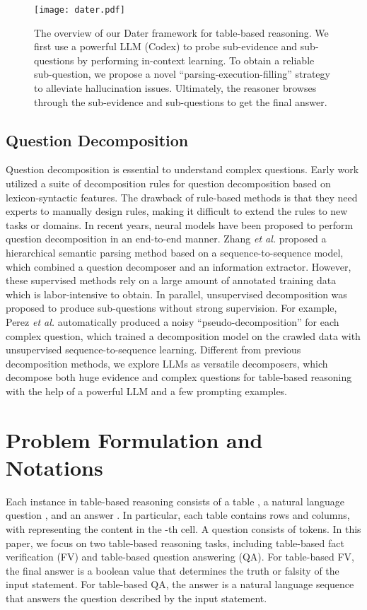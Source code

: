 \documentclass{article}
\begin{document}
\begin{figure*}
    \centering
    \setlength{\abovecaptionskip}{5pt} 
    \texttt{[image: dater.pdf]}
    \caption{The overview of our Dater framework for table-based reasoning. We first use a powerful LLM (Codex) to probe sub-evidence and sub-questions by performing in-context learning. To obtain a reliable sub-question, we propose a novel ``parsing-execution-filling'' strategy to alleviate hallucination issues. Ultimately, the reasoner browses through the sub-evidence and sub-questions to get the final answer.
    }
    \label{pipeline}
\end{figure*}

\subsection{Question Decomposition}
Question decomposition is essential to understand complex questions. Early work \citep{kalyanpur2012fact} utilized a suite of decomposition rules for question decomposition based on lexicon-syntactic features. The drawback of rule-based methods is that they need experts to manually design rules, making it difficult to extend the rules to new tasks or domains. In recent years, neural models \citep{talmor2018web,zhang2019complex} have been proposed to perform question decomposition in an end-to-end manner.
Zhang \textit{et al.} \citep{zhang2019complex} proposed a hierarchical semantic parsing method based on a sequence-to-sequence model, which combined a question decomposer and an information extractor. 
However, these supervised methods rely on a large amount of annotated training data which is labor-intensive to obtain. In parallel, unsupervised decomposition was proposed to produce sub-questions without strong supervision. For example, Perez \textit{et al.} \citep{perez2020unsupervised} automatically produced a noisy ``pseudo-decomposition'' for
each complex question, which trained a
decomposition model on the crawled data with unsupervised sequence-to-sequence learning. 
Different from previous decomposition methods, we explore LLMs as versatile decomposers, which decompose both huge evidence and complex questions for table-based reasoning with the help of a powerful LLM and a few prompting examples. 


\section{Problem Formulation and Notations}
Each instance in table-based reasoning consists of a table , a natural language question , and an answer . In particular, each table  contains  rows and  columns, with  representing the content in the -th cell. A question  consists of  tokens. In this paper, we focus on two table-based reasoning tasks, including table-based fact verification (FV) and table-based question answering (QA). For table-based FV, the final answer  is a boolean value that determines the truth or falsity of the input statement. For table-based QA, the answer is a natural language sequence  that answers the question described by the input statement.
\end{document}
